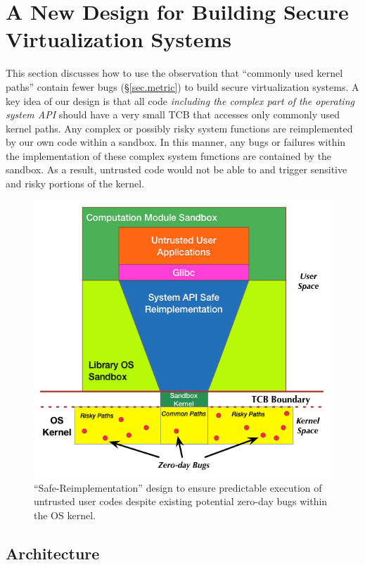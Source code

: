 \section{A New Design for Building Secure Virtualization Systems}
\label{sec.design}

This section discusses how to use the observation
 that ``commonly used kernel paths'' contain fewer bugs
(\S{\ref{sec.metric}}) to build secure virtualization systems.
A key idea of our design is that all code \emph{including the complex part
of the operating system API} should have a very small TCB that accesses only
commonly used kernel paths.
Any complex or possibly risky system functions
are reimplemented by our own code within a sandbox. In this manner, any bugs
or failures within the implementation of these complex system functions
are contained by the sandbox. As a result, untrusted code would not be able to
and trigger sensitive and risky portions of the kernel.


\begin{figure}%
\centering
\includegraphics[width=1.0\columnwidth]{diagram/lind_secure_design_new.png}
\caption{``Safe-Reimplementation'' design to ensure predictable execution of untrusted user codes despite existing potential zero-day bugs within the OS kernel.}
\label{fig:design}
\end{figure}

\subsection{Architecture}


